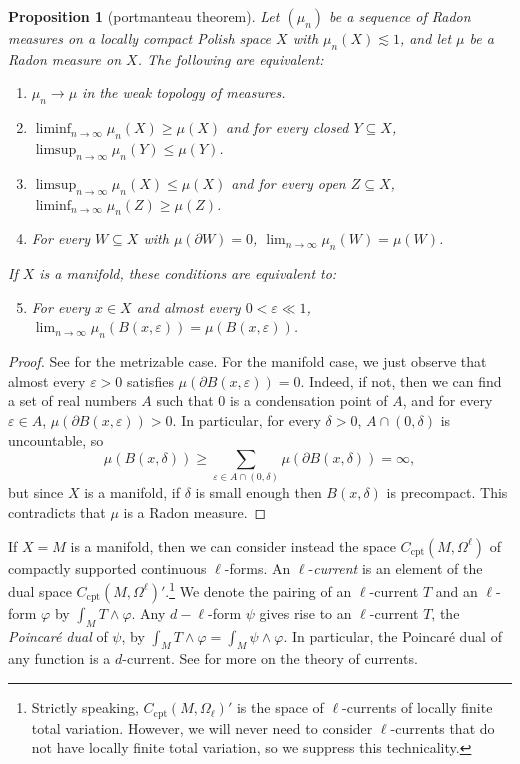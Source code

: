 \documentclass[reqno,11pt]{amsart}
\newcommand{\dfn}[1]{\emph{#1}\index{#1}}
\newcommand{\cpt}{\mathrm{cpt}}
\newtheorem{proposition}[theorem]{Proposition}
\theoremstyle{definition}
\numberwithin{equation}{section}
\begin{document}
\begin{proposition}[portmanteau theorem]
	Let $(\mu_n)$ be a sequence of Radon measures on a locally compact Polish space $X$ with $\mu_n(X) \lesssim 1$, and let $\mu$ be a Radon measure on $X$. The following are equivalent:
\begin{enumerate}
	\item $\mu_n \to \mu$ in the weak topology of measures.
	\item $\liminf_{n \to \infty} \mu_n(X) \geq \mu(X)$ and for every closed $Y \subseteq X$, $\limsup_{n \to \infty} \mu_n(Y) \leq \mu(Y)$.
	\item $\limsup_{n \to \infty} \mu_n(X) \leq \mu(X)$ and for every open $Z \subseteq X$, $\liminf_{n \to \infty} \mu_n(Z) \geq \mu(Z)$.
	\item For every $W \subseteq X$ with $\mu(\partial W) = 0$, $\lim_{n \to \infty} \mu_n(W) = \mu(W)$.
\end{enumerate}
	If $X$ is a manifold, these conditions are equivalent to:
\begin{enumerate}
	\setcounter{enumi}{4}
	\item For every $x \in X$ and almost every $0 < \varepsilon \ll 1$, $\lim_{n \to \infty} \mu_n(B(x, \varepsilon)) = \mu(B(x, \varepsilon))$.
\end{enumerate}
\end{proposition}
\begin{proof}
	See \cite[Theorem 13.16]{klenke2013probability} for the metrizable case.
	For the manifold case, we just observe that almost every $\varepsilon > 0$ satisfies $\mu(\partial B(x, \varepsilon)) = 0$. Indeed, if not, then we can find a set of real numbers $A$ such that $0$ is a condensation point of $A$, and for every $\varepsilon \in A$, $\mu(\partial B(x, \varepsilon)) > 0$.
	In particular, for every $\delta > 0$, $A \cap (0, \delta)$ is uncountable, so
	$$\mu(B(x, \delta)) \geq \sum_{\varepsilon \in A \cap (0, \delta)} \mu(\partial B(x, \delta)) = \infty,$$
	but since $X$ is a manifold, if $\delta$ is small enough then $B(x, \delta)$ is precompact.
	This contradicts that $\mu$ is a Radon measure.
\end{proof}

If $X = M$ is a manifold, then we can consider instead the space $C_\cpt(M, \Omega^\ell)$ of compactly supported continuous $\ell$-forms.
An $\ell$-\dfn{current} is an element of the dual space $C_\cpt(M, \Omega^\ell)'$.\footnote{Strictly speaking, $C_\cpt(M, \Omega_\ell)'$ is the space of $\ell$-currents of locally finite total variation. However, we will never need to consider $\ell$-currents that do not have locally finite total variation, so we suppress this technicality.}
We denote the pairing of an $\ell$-current $T$ and an $\ell$-form $\varphi$ by $\int_M T \wedge \varphi$.
Any $d-\ell$-form $\psi$ gives rise to an $\ell$-current $T$, the \dfn{Poincar\'e dual} of $\psi$, by $\int_M T \wedge \varphi = \int_M \psi \wedge \varphi$.
In particular, the Poincar\'e dual of any function is a $d$-current.
See \cite{simon1983GMT} for more on the theory of currents.
\end{document}
